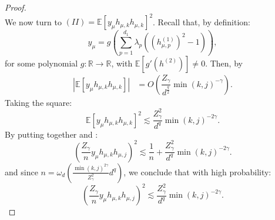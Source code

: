 \documentclass[10pt,a4paper]{amsart}
\newcommand{\EE}{\mathbb{E}}
\newcommand{\RR}{\mathbb{R}}
\begin{document}
\begin{proof}
\begin{equation}
        \label{eq:bound_I_sum_y}
    \end{equation}
    We now turn to $(II)= \EE \left [ y_\mu h_{\mu,k}h_{\mu,k} \right ] ^{2}$. Recall that, by definition: 
    \begin{equation}
        y_\mu = g\left ( \sum_{p=1}^{d_1}  \lambda_p ((h^{(1)}_{\mu, p})^{2} - 1) \right ),
    \end{equation}
    for some polynomial $g:\RR \to \RR$, with $\EE[g'(h^{(2)})] \not = 0$. Then, by 
    \begin{align}
         \left | \EE \left [ y_\mu h_{\mu,k}h_{\mu,k} \right ] \right | &= O \left ( \dfrac{Z_\gamma }{d^{\frac{q}{2}}} \min(k,j)^{-\gamma} \right ). 
    \end{align}
    Taking the square:
    \begin{equation}
        \EE \left [ y_\mu h_{\mu,k}h_{\mu,k} \right ]^{2} \lesssim \dfrac{Z_\gamma ^2}{d^{q}} \min(k,j)^{-2\gamma}. 
        \label{eq:bound_II_sum_y}
    \end{equation}
    By putting together  and : 
    \begin{equation}
         \left ( \dfrac{Z_\gamma }{n} y_\mu h_{\mu,k} h_{\mu,j} \right )^{2} \lesssim \dfrac{1}{n} + \dfrac{Z_\gamma ^2}{d^{q}} \min(k,j)^{-2\gamma}.
    \end{equation}
    and since $n = \omega_{d}(\frac{\min(k,j)^{2\gamma}}{Z_\gamma ^{2}}d^{q} )$,  we conclude that with high probability: 
    \begin{equation}
        \left ( \dfrac{Z_\gamma }{n} y_\mu h_{\mu,k} h_{\mu,j} \right )^{2} \lesssim \dfrac{Z_\gamma ^2}{d^{q}} \min(k,j)^{-2\gamma}. 
    \end{equation}
\end{proof}
\end{document}
